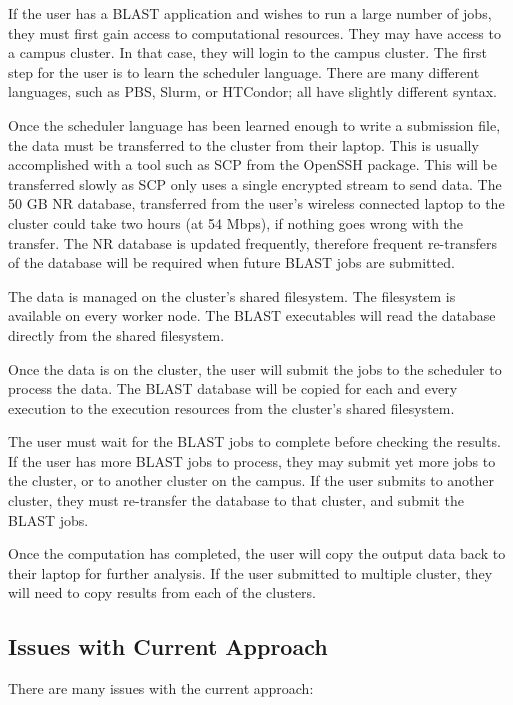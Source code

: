 If the user has a BLAST application and wishes to run a large number of jobs, they must first gain access to computational resources.  They may have access to a campus cluster.  In that case, they will login to the campus cluster.  The first step for the user is to learn the scheduler language.  There are many different languages, such as PBS, Slurm, or HTCondor; all  have slightly different syntax.

Once the scheduler language has been learned enough to write a submission file, the data must be transferred to the cluster from their laptop.  This is usually accomplished with a tool such as SCP from the OpenSSH \cite{openssh} package.  This will be transferred slowly as SCP only uses a single encrypted stream to send data.  The 50 GB NR database, transferred from the user's wireless connected laptop to the cluster could take two hours (at 54 Mbps), if nothing goes wrong with the transfer.  The NR database is updated frequently, therefore frequent re-transfers of the database will be required when future BLAST jobs are submitted.

The data is managed on the cluster's shared filesystem.  The filesystem is available on every worker node.  The BLAST executables will read the database directly from the shared filesystem.

Once the data is on the cluster, the user will submit the jobs to the scheduler to process the data.  The BLAST database will be copied for each and every execution to the execution resources from the cluster's shared filesystem.

The user must wait for the BLAST jobs to complete before checking the results.  If the user has more BLAST jobs to process, they may submit yet more jobs to the cluster, or to another cluster on the campus.  If the user submits to another cluster, they must re-transfer the database to that cluster, and submit the BLAST jobs.

Once the computation has completed, the user will copy the output data back to their laptop for further analysis.  If the user submitted to multiple cluster, they will need to copy results from each of the clusters.

\subsection{Issues with Current Approach}

There are many issues with the current approach:

